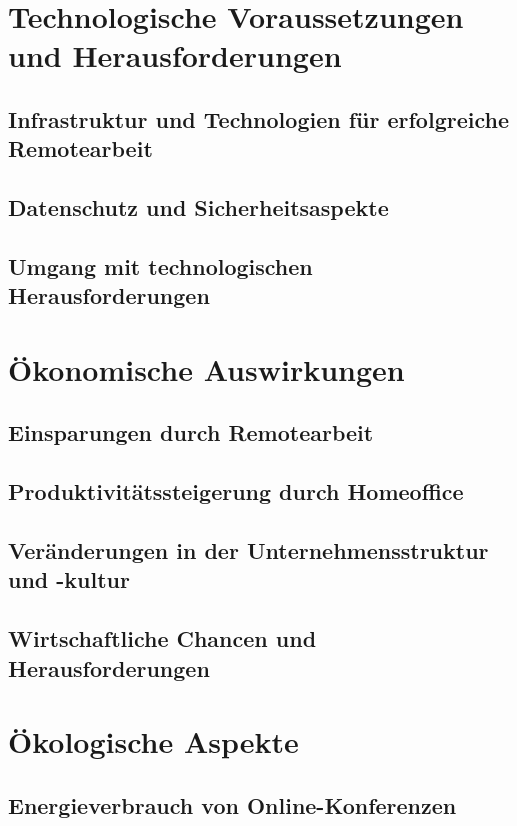 \documentclass[runningheads]{llncs}
\begin{document}
\newpage
\section{Technologische Voraussetzungen und Herausforderungen}

\subsection{Infrastruktur und Technologien für erfolgreiche Remotearbeit}

\subsection{Datenschutz und Sicherheitsaspekte}

\subsection{Umgang mit technologischen Herausforderungen}

\newpage
\section{Ökonomische Auswirkungen}

\subsection{Einsparungen durch Remotearbeit}

\subsection{Produktivitätssteigerung durch Homeoffice}

\subsection{Veränderungen in der Unternehmensstruktur und -kultur}

\subsection{Wirtschaftliche Chancen und Herausforderungen}


\newpage
\section{Ökologische Aspekte}

\subsection{Energieverbrauch von Online-Konferenzen}
\end{document}
